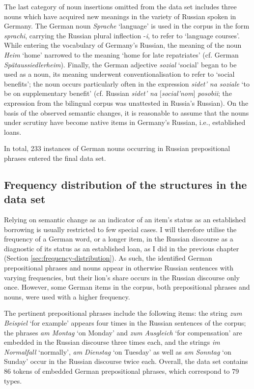 The last category of noun insertions omitted from the data set includes three nouns which have acquired new meanings in the variety of Russian spoken in Germany. The German noun \textit{Sprache} `language' is used in the corpus in the form \textit{sprachi}, carrying the Russian plural inflection -\textit{i}, to refer to `language courses'. While entering the vocabulary of Germany's Russian, the meaning of the noun \textit{Heim} `home' narrowed to the meaning `home for late repatriates' (cf. German \textit{Spätaussiedlerheim}). Finally, the German adjective \textit{sozial} `social' began to be used as a noun, its meaning underwent conventionalisation to refer to `social benefits'; the noun occurs particularly often in the expression \textit{sidet' na soziale} `to be on supplementary benefit' (cf. Russian \textit{sidet' na \([\)social'nom\(]\) posobii}; the expression from the bilingual corpus was unattested in Russia's  Russian). On the basis of the observed semantic changes, it is reasonable to assume that the nouns under scrutiny have become native items in Germany's Russian, i.e., established loans. 

In total, 233 instances of German nouns occurring in Russian prepositional phrases entered the final data set.

\subsection{Frequency distribution of the structures in the data set}

\noindent Relying on semantic change as an indicator of an item's status as an established borrowing is usually restricted to few special cases. I will therefore utilise the frequency of a German word, or a longer item, in the Russian discourse as a diagnostic of its status as an established loan, as I did in the previous chapter (Section \ref{sec:frequency-distribution}). As such, the identified German prepositional phrases and nouns appear in otherwise Russian sentences with varying frequencies, but their lion's share occurs in the Russian discourse only once. However, some German items in the corpus, both prepositional phrases and nouns, were used with a higher frequency.

The pertinent prepositional phrases include the following items: the string \textit{zum Beispiel} `for example' appears four times in the Russian sentences of the corpus; the phrases \textit{am Montag} `on Monday' and \textit{zum Ausgleich} `for compensation' are embedded in the Russian discourse three times each, and the strings \textit{im Normalfall} `normally', \textit{am Dienstag} `on Tuesday' as well as \textit{am Sonntag} `on Sunday' occur in the Russian discourse twice each. Overall, the data set contains 86 tokens of embedded German prepositional phrases, which correspond to 79 types.

